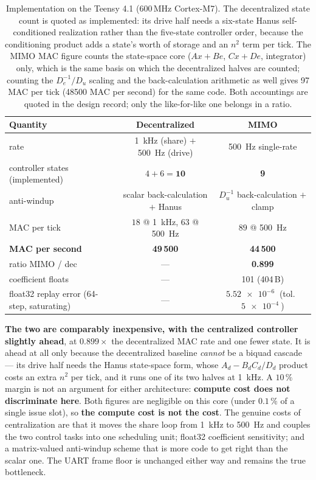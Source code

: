 \documentclass[energies,article,submit,pdftex,oneauthor]{Definitions/mdpi}
\begin{document}
\begin{table}[H]
\caption{Implementation on the Teensy 4.1 (600\,MHz Cortex-M7). The decentralized state count is
quoted as implemented: its drive half needs a six-state Hanus self-conditioned realization rather
than the five-state controller order, because the conditioning product adds a state's worth of
storage and an $n^2$ term per tick. The MIMO MAC figure counts the state-space core
($Ax + Be$, $Cx + De$, integrator) only, which is the same basis on which the decentralized
halves are counted; counting the $D_e^{-1}/D_u$ scaling and the back-calculation arithmetic as
well gives \num{97} MAC per tick (\SI{48500}{} MAC per second) for the same code. Both
accountings are quoted in the design record; only the like-for-like one belongs in a ratio.}
\label{tab:cost}
\begin{tabularx}{\textwidth}{lCC}
\toprule
\textbf{Quantity} & \textbf{Decentralized} & \textbf{MIMO} \\
\midrule
rate & \SI{1}{\kilo\hertz} (share) $+$ \SI{500}{\hertz} (drive) & \SI{500}{\hertz} single-rate \\
controller states (implemented) & $4 + 6 = \mathbf{10}$ & \textbf{9} \\
anti-windup & scalar back-calculation $+$ Hanus & $D_u^{-1}$ back-calculation $+$ clamp \\
MAC per tick & $18$ @ \SI{1}{\kilo\hertz}, $63$ @ \SI{500}{\hertz} & $89$ @ \SI{500}{\hertz} \\
\textbf{MAC per second} & \textbf{49\,500} & \textbf{44\,500} \\
ratio MIMO / dec & --- & \textbf{0.899} \\
coefficient floats & --- & 101 (404\,B) \\
float32 replay error (64-step, saturating) & --- & $\SI{5.52e-6}{}$ (tol.\ $\SI{5e-4}{}$) \\
\bottomrule
\end{tabularx}
\end{table}

\textbf{The two are comparably inexpensive, with the
centralized controller slightly ahead}, at $0.899\times$ the decentralized MAC rate and one fewer
state. It is ahead at all only because the decentralized baseline \emph{cannot} be a biquad
cascade --- its drive half needs the Hanus state-space form, whose $A_d - B_d C_d/D_d$ product
costs an extra $n^2$ per tick, and it runs one of its two halves at \SI{1}{\kilo\hertz}. A
$10\,\%$ margin is not an argument for either architecture:
\textbf{compute cost does not discriminate here}. Both figures are
negligible on this core (under $0.1\,\%$ of a single issue slot), so \textbf{the compute cost is
not the cost}. The genuine costs of centralization are that it moves the share loop from
\SI{1}{\kilo\hertz} to \SI{500}{\hertz} and couples the two control tasks into one scheduling
unit; float32 coefficient sensitivity; and a matrix-valued anti-windup scheme that is more code
to get right than the scalar one. The UART frame floor is unchanged either way and remains the
true bottleneck.
\end{document}
